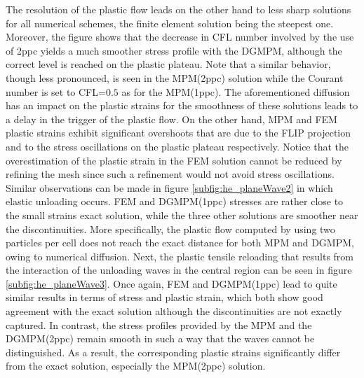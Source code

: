 The resolution of the plastic flow leads on the other hand to less sharp solutions for all numerical schemes, the finite element solution being the steepest one.
Moreover, the figure shows that the decrease in CFL number involved by the use of 2ppc yields a much smoother stress profile with the DGMPM, although the correct level is reached on the plastic plateau.
Note that a similar behavior, though less pronounced, is seen in the MPM(2ppc) solution while the Courant number is set to CFL=$0.5$ as for the MPM(1ppc).
The aforementioned diffusion has an impact on the plastic strains for the smoothness of these solutions leads to a delay in the trigger of the plastic flow.
On the other hand, MPM and FEM plastic strains exhibit significant overshoots that are due to the FLIP projection \cite{Thesis} and to the stress oscillations on the plastic plateau respectively.
Notice that the overestimation of the plastic strain in the FEM solution cannot be reduced by refining the mesh since such a refinement would not avoid stress oscillations.
%
Similar observations can be made in figure \ref{subfig:he_planeWave2} in which elastic unloading occurs.
FEM and DGMPM(1ppc) stresses are rather close to the small strains exact solution, while the three other solutions are smoother near the discontinuities.
More specifically, the plastic flow computed by using two particles per cell does not reach the exact distance for both MPM and DGMPM, owing to numerical diffusion.
%
Next, the plastic tensile reloading that results from the interaction of the unloading waves in the central region can be seen in figure \ref{subfig:he_planeWave3}.
Once again, FEM and DGMPM(1ppc) lead to quite similar results in terms of stress and plastic strain, which both show good agreement with the exact solution although the discontinuities are not exactly captured.
In contrast, the stress profiles provided by the MPM and the DGMPM(2ppc) remain smooth in such a way that the waves cannot be distinguished.
As a result, the corresponding plastic strains significantly differ from the exact solution, especially the MPM(2ppc) solution.

